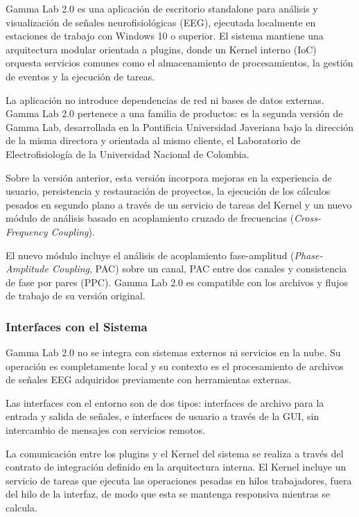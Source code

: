 \documentclass[12pt, letterpaper]{article}
\begin{document}
Gamma Lab 2.0 es una aplicación de escritorio standalone para análisis y
visualización de señales neurofisiológicas (EEG), ejecutada localmente en
estaciones de trabajo con Windows 10 o superior. El sistema mantiene una
arquitectura modular orientada a plugins, donde un Kernel interno (IoC)
orquesta servicios comunes como el almacenamiento de procesamientos, la
gestión de eventos y la ejecución de tareas.

La aplicación no introduce dependencias de red ni bases de datos externas.
Gamma Lab 2.0 pertenece a una familia de productos: es la segunda versión de
Gamma Lab, desarrollada en la Pontificia Universidad Javeriana bajo la
dirección de la misma directora y orientada al mismo cliente, el Laboratorio
de Electrofisiología de la Universidad Nacional de Colombia.

Sobre la versión anterior, esta versión incorpora mejoras en la experiencia
de usuario, persistencia y restauración de proyectos, la ejecución de los cálculos pesados
en segundo plano a través de un servicio de tareas del Kernel y un nuevo módulo
de análisis basado en acoplamiento cruzado de frecuencias
(\textit{Cross-Frequency Coupling}).

El nuevo módulo incluye el análisis de acoplamiento fase-amplitud
(\textit{Phase-Amplitude Coupling}, PAC) sobre un canal, PAC entre dos
canales y consistencia de fase por pares (PPC). Gamma Lab 2.0 es compatible con los
archivos y flujos de trabajo de su versión original.

\subsubsection{Interfaces con el Sistema}

Gamma Lab 2.0 no se integra con sistemas externos ni servicios en la nube.
Su operación es completamente local y su contexto es el procesamiento de
archivos de señales EEG adquiridos previamente con herramientas externas.

Las interfaces con el entorno son de dos tipos: interfaces de archivo para la
entrada y salida de señales, e interfaces de usuario a través de la GUI, sin
intercambio de mensajes con servicios remotos.

La comunicación entre los plugins y el Kernel del sistema se realiza a través
del contrato de integración definido en la arquitectura interna. El Kernel
incluye un servicio de tareas que ejecuta las operaciones pesadas en hilos
trabajadores, fuera del hilo de la interfaz, de modo que esta se mantenga
responsiva mientras se calcula.
\end{document}
